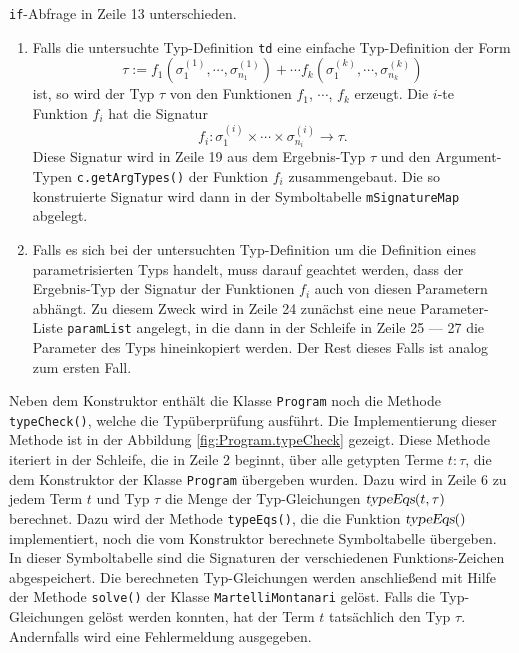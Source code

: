 \texttt{if}-Abfrage in Zeile 13 unterschieden.
\begin{enumerate}
\item Falls die untersuchte Typ-Definition \texttt{td} eine einfache Typ-Definition der Form
      \[ \tau := f_1(\sigma_1^{(1)}, \cdots, \sigma_{n_1}^{(1)}) + \cdots
                 f_k(\sigma_1^{(k)}, \cdots, \sigma_{n_k}^{(k)})
      \]
      ist, so wird der Typ $\tau$ von den Funktionen $f_1$, $\cdots$, $f_k$ erzeugt.  Die $i$-te
      Funktion $f_i$ hat die Signatur
      \[ f_i: \sigma_1^{(i)} \times \cdots \times \sigma_{n_i}^{(i)} \rightarrow \tau.  \]
      Diese Signatur wird in Zeile 19 aus dem Ergebnis-Typ $\tau$ und den Argument-Typen 
      \texttt{c.getArgTypes()} der Funktion $f_i$ zusammengebaut.  Die so konstruierte Signatur
      wird dann in der Symboltabelle \texttt{mSignatureMap} abgelegt.
\item Falls es sich bei der untersuchten Typ-Definition um die Definition eines parametrisierten
      Typs handelt, muss darauf geachtet werden, dass der Ergebnis-Typ der Signatur der Funktionen
      $f_i$ auch von diesen Parametern abh\"angt.  Zu diesem Zweck wird in Zeile 24 zun\"achst eine neue
      Parameter-Liste \texttt{paramList} angelegt, in die dann in der Schleife in Zeile 25 --- 27
      die Parameter des Typs hineinkopiert werden.  Der Rest dieses Falls ist analog zum ersten Fall.
\end{enumerate}
Neben dem Konstruktor enth\"alt die Klasse \texttt{Program} noch die Methode \texttt{typeCheck()},
welche die Typ\"uberpr\"ufung ausf\"uhrt.  Die Implementierung dieser Methode ist in der Abbildung
\ref{fig:Program.typeCheck} gezeigt.  Diese Methode iteriert in der Schleife, die in Zeile 2
beginnt, \"uber alle getypten Terme $t: \tau$, die dem Konstruktor der Klasse \texttt{Program}
\"ubergeben wurden.   Dazu wird in Zeile 6 zu jedem Term $t$ und Typ $\tau$ die Menge der
Typ-Gleichungen $\textsl{typeEqs}(t,\tau)$ berechnet.  Dazu wird der Methode \texttt{typeEqs()}, die
die Funktion $\textsl{typeEqs}()$ implementiert, noch die vom Konstruktor berechnete Symboltabelle
\"ubergeben.  In dieser Symboltabelle sind die Signaturen der verschiedenen Funktions-Zeichen
abgespeichert.   Die berechneten Typ-Gleichungen werden anschlie{\ss}end mit Hilfe der Methode
\texttt{solve()}  der Klasse \texttt{MartelliMontanari} gel\"ost.  Falls die Typ-Gleichungen
gel\"ost werden konnten, hat der Term $t$ tats\"achlich den Typ $\tau$.  Andernfalls wird eine
Fehlermeldung ausgegeben.


